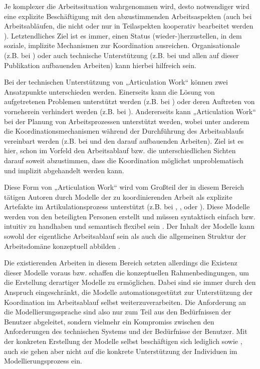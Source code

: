 Je komplexer die Arbeitssituation wahrgenommen wird, desto notwendiger wird eine explizite Beschäftigung mit den abzustimmenden Arbeitsaspekten (auch bei Arbeitsabläufen, die nicht oder nur in Teilaspekten kooperativ bearbeitet werden \citep{Fjuk97}). Letztendliches Ziel ist es immer, einen Status (wieder-)herzustellen, in dem soziale, implizite Mechanismen zur Koordination ausreichen. Organisationale (z.B. bei \citep{Grinter96}) oder auch technische Unterstützung (z.B. bei \citep{Schmidt00} und allen auf dieser Publikation aufbauenden Arbeiten) kann hierbei hilfreich sein.

Bei der technischen Unterstützung von „Articulation Work“ können zwei Ansatzpunkte unterschieden werden. Einerseits kann die Lösung von aufgetretenen Problemen unterstützt werden (z.B. bei \citep{Grinter96}) oder deren Auftreten von vorneherein verhindert werden (z.B. bei \citep{Raposo04}). Andererseits kann „Articulation Work“ bei der Planung von Arbeitsprozessen unterstützt werden, wobei unter anderem die Koordinationsmechanismen während der Durchführung des Arbeitsablaufs vereinbart werden (z.B. bei \citet{Sarini02a} und den darauf aufbauenden Arbeiten). Ziel ist es hier, schon im Vorfeld den Arbeitsablauf bzw. die unterschiedlichen Sichten darauf soweit abzustimmen, dass die Koordination möglichst unproblematisch und implizit abgehandelt werden kann.

Diese Form von „Articulation Work“ wird vom Großteil der in diesem Bereich tätigen Autoren durch Modelle der zu koordinierenden Arbeit als explizite Artefakte im Artikulationsprozess unterstützt (z.B. bei \citep{Divitini00}, \citep{Sarini02}, \citep{Raposo04} oder \citep{Jorgensen04}). Diese Modelle werden von den beteiligten Personen erstellt und müssen syntaktisch einfach bzw. intuitiv zu handhaben und semantisch flexibel sein \citep{Herrmann02} \citep{Jorgensen04}. Der Inhalt der Modelle kann sowohl der eigentliche Arbeitsablauf sein \citep{Divitini00} als auch die allgemeinen Struktur der Arbeitsdomäne konzeptuell abbilden \citep{Sarini02}. 

Die existierenden Arbeiten in diesem Bereich setzten allerdings die Existenz dieser Modelle voraus bzw. schaffen die konzeptuellen Rahmenbedingungen, um die Erstellung derartiger Modelle zu ermöglichen. Dabei sind sie immer durch den Anspruch eingeschränkt, die Modelle automationsgestützt zur Unterstützung der Koordination im Arbeitsablauf selbst weiterzuverarbeiten. Die Anforderung an die Modellierungssprache sind also nur zum Teil aus den Bedürfnissen der Benutzer abgeleitet, sondern vielmehr ein Kompromiss zwischen den Anforderungen des technischen Systems und der Bedürfnisse der Benutzer. Mit der konkreten Erstellung der Modelle selbst beschäftigen sich lediglich \citet{Herrmann02} sowie \citet{Jorgensen04}, auch sie gehen aber nicht auf die konkrete Unterstützung der Individuen im Modellierungsprozess ein.

